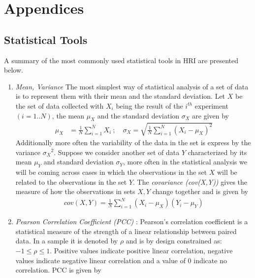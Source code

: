 
\chapter{Appendices}
\label{AppendixA}

\section{Statistical Tools} %
\label{appendix:stat_tools}
	A summary of the most commonly used statistical tools in HRI are presented below.
\begin{enumerate}[leftmargin={0.5cm},topsep={0pt},itemsep={0pt},partopsep={0pt},parsep={0pt}] 
\item \emph{Mean, Variance} The most simplest way of statistical analysis of a set of data is to represent them with their mean and the standard deviation. Let $X$ be the set of data collected with $X_i$ being the result of the $i^{th}$ experiment $(i = 1..N)$, the mean $\mu_X$ and the standard deviation $\sigma_X$ are given by
\begin{align*}
\mu_X    &= \frac{1}{N} \sum_{i=1}^{N} X_i\ ; \quad \sigma_X = \sqrt{\frac{1}{N} \sum_{i=1}^{N} (X_i - \mu_X)^2}
\end{align*}
Additionally more often the variability of the data in the set is express by the variance ${\sigma_X}^2$. Suppose we consider another set of data $Y$ characterized by its mean $\mu_Y$ and standard deviation $\sigma_Y$, more often in the statistical analysis we will be coming across cases in which the observations in the set $X$ will be related to the observations in the set $Y$. The \emph{covariance (cov(X,Y))} gives the measure of how the observations in sets $X,Y$ change together and is given by
\begin{align*}
cov(X,Y) = \frac{1}{N} \sum_{i=1}^{N} (X_i - \mu_X) (Y_i - \mu_Y) 
\end{align*}
\item \emph{Pearson Correlation Coefficient (PCC)} : Pearson’s correlation coefficient is a statistical measure of the strength of a linear relationship between paired data. In a sample it is denoted by $\rho$ and is by design constrained as: $-1 \leq \rho \leq 1$. Positive values indicate positive linear correlation, negative values indicate negative linear correlation and a value of 0 indicate no correlation. PCC is given by

\end{enumerate}
